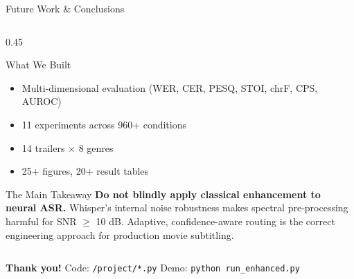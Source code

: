 \documentclass[aspectratio=169]{beamer}
\begin{document}
\begin{frame}{Future Work \& Conclusions}
\begin{columns}[T]
\begin{column}{0.45\textwidth}
\begin{block}{What We Built}
\begin{itemize}
          \item Multi-dimensional evaluation (WER, CER, PESQ, STOI, chrF, CPS, AUROC)
          \item 11 experiments across 960+ conditions
          \item 14 trailers $\times$ 8 genres
          \item 25+ figures, 20+ result tables
        \end{itemize}
      \end{block}
      \begin{alertblock}{The Main Takeaway}
        \textbf{Do not blindly apply classical enhancement to neural ASR.} Whisper's internal noise robustness makes spectral pre-processing harmful for SNR $\geq$ 10 dB. Adaptive, confidence-aware routing is the correct engineering approach for production movie subtitling.
      \end{alertblock}
    \end{column}
  \end{columns}
  \vspace{0.4cm}
  \begin{center}
    \large\textbf{Thank you!} \quad Code: \texttt{/project/*.py} \quad Demo: \texttt{python run\_enhanced.py}
  \end{center}
\end{frame}
\end{document}

